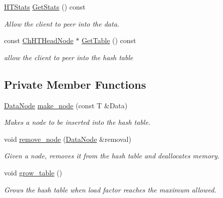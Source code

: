 \begin{DoxyCompactItemize}
\hyperlink{structHTStats}{H\-T\-Stats} \hyperlink{classChHashTable_afba4de84c186cd7392478f63ea76036e}{Get\-Stats} () const 
\begin{DoxyCompactList}\small\item\em Allow the client to peer into the data. \end{DoxyCompactList}\item 
const \hyperlink{structChHashTable_1_1ChHTHeadNode}{Ch\-H\-T\-Head\-Node} $\ast$ \hyperlink{classChHashTable_aa48fb6a3c6ec9bf5a0e94d23fe0b81bc}{Get\-Table} () const 
\begin{DoxyCompactList}\small\item\em allow the client to peer into the hash table \end{DoxyCompactList}\end{DoxyCompactItemize}
\subsection*{Private Member Functions}
\begin{DoxyCompactItemize}
\item 
\hyperlink{classChHashTable_a3fbb8fddd32b61fba7814d6a90d2dedc}{Data\-Node} \hyperlink{classChHashTable_a25085c87c3fa50e56845176fcdd4416d}{make\-\_\-node} (const T \&Data)
\begin{DoxyCompactList}\small\item\em Makes a node to be inserted into the hash table. \end{DoxyCompactList}\item 
void \hyperlink{classChHashTable_a5fbc7e3701ad8203a344e4f71df50072}{remove\-\_\-node} (\hyperlink{classChHashTable_a3fbb8fddd32b61fba7814d6a90d2dedc}{Data\-Node} \&removal)
\begin{DoxyCompactList}\small\item\em Given a node, removes it from the hash table and deallocates memory. \end{DoxyCompactList}\item 
\hypertarget{classChHashTable_a888807d343a537be7ff44713a2a56813}{void \hyperlink{classChHashTable_a888807d343a537be7ff44713a2a56813}{grow\-\_\-table} ()}\label{classChHashTable_a888807d343a537be7ff44713a2a56813}

\begin{DoxyCompactList}\small\item\em Grows the hash table when load factor reaches the maximum allowed. \end{DoxyCompactList}\end{DoxyCompactItemize}
